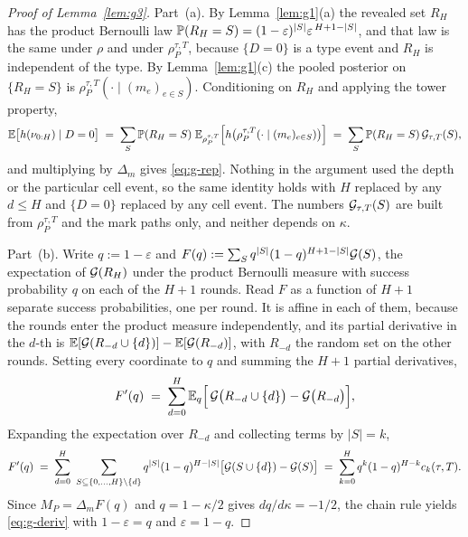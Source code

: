 \begin{proof}[Proof of Lemma~\ref{lem:g3}]
Part~(a). By Lemma~\ref{lem:g1}(a) the revealed set $R_H$ has the product Bernoulli law
$\mathbb{P}(R_H = S) = (1-\varepsilon)^{|S|}\varepsilon^{\,H+1-|S|}$, and that law is the same under
$\rho$ and under $\rho_P^{\tau,T}$, because $\{D=0\}$ is a type event and $R_H$ is independent of
the type. By Lemma~\ref{lem:g1}(c) the pooled posterior on $\{R_H = S\}$ is
$\rho_P^{\tau,T}(\cdot \mid (m_e)_{e \in S})$. Conditioning on $R_H$ and applying the tower
property,
\[
\mathbb{E}\bigl[h(\nu_{0:H}) \mid D=0\bigr]
\;=\; \sum_{S} \mathbb{P}(R_H = S)\;
\mathbb{E}_{\rho_P^{\tau,T}}\Bigl[h\bigl(\rho_P^{\tau,T}(\cdot\mid (m_e)_{e\in S})\bigr)\Bigr]
\;=\; \sum_S \mathbb{P}(R_H = S)\,\mathcal{G}_{\tau,T}(S),
\]
and multiplying by $\Delta_m$ gives \eqref{eq:g-rep}. Nothing in the argument used the depth or
the particular cell event, so the same identity holds with $H$ replaced by any $d \le H$ and
$\{D=0\}$ replaced by any cell event. The numbers $\mathcal{G}_{\tau,T}(S)$ are built from
$\rho_P^{\tau,T}$ and the mark paths only, and neither depends on $\kappa$.

Part~(b). Write $q := 1-\varepsilon$ and $F(q) := \sum_S q^{|S|}(1-q)^{H+1-|S|}\mathcal{G}(S)$, the
expectation of $\mathcal{G}(R_H)$ under the product Bernoulli measure with success probability $q$ on
each of the $H+1$ rounds. Read $F$ as a function of $H+1$ separate success probabilities, one
per round. It is affine in each of them, because the rounds enter the product measure
independently, and its partial derivative in the $d$-th is
$\mathbb{E}[\mathcal{G}(R_{-d}\cup\{d\})] - \mathbb{E}[\mathcal{G}(R_{-d})]$, with $R_{-d}$ the random set on the other
rounds. Setting every coordinate to $q$ and summing the $H+1$ partial derivatives,
\[
F'(q) \;=\; \sum_{d=0}^{H}
\mathbb{E}_{q}\Bigl[\,\mathcal{G}\bigl(R_{-d}\cup\{d\}\bigr) - \mathcal{G}\bigl(R_{-d}\bigr)\Bigr],
\]
Expanding the expectation over $R_{-d}$ and collecting terms by $|S| = k$,
\[
F'(q) \;=\; \sum_{d=0}^{H}\ \sum_{S \subseteq \{0,\ldots,H\}\setminus\{d\}}
q^{|S|}(1-q)^{H-|S|}\bigl[\mathcal{G}(S\cup\{d\})-\mathcal{G}(S)\bigr]
\;=\; \sum_{k=0}^{H} q^{k}(1-q)^{H-k} c_k(\tau,T).
\]
Since $M_P = \Delta_m F(q)$ and $q = 1-\kappa/2$ gives $dq/d\kappa = -1/2$, the chain rule yields
\eqref{eq:g-deriv} with $1-\varepsilon = q$ and $\varepsilon = 1-q$.


\end{proof}
